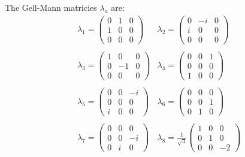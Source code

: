 The Gell-Mann matricies $\lambda_a$ are:
\begin{equation}
  \begin{aligned}
    &\lambda_1 = \left(\begin{matrix} 0 & 1 & 0 \\ 1 & 0 & 0 \\ 0 & 0 & 0 \end{matrix}\right) &\lambda_2 = \left(\begin{matrix} 0 & -i & 0 \\ i & 0 & 0 \\ 0 & 0 & 0 \end{matrix}\right) \\\\
    &\lambda_3 = \left(\begin{matrix} 1 & 0 & 0 \\ 0 & -1 & 0 \\ 0 & 0 & 0 \end{matrix}\right) &\lambda_4 = \left(\begin{matrix} 0 & 0 & 1 \\ 0 & 0 & 0 \\ 1 & 0 & 0 \end{matrix}\right) \\\\
    &\lambda_5 = \left(\begin{matrix} 0 & 0 & -i \\ 0 & 0 & 0 \\ i & 0 & 0 \end{matrix}\right) &\lambda_6 = \left(\begin{matrix} 0 & 0 & 0 \\ 0 & 0 & 1 \\ 0 & 1 & 0 \end{matrix}\right) \\\\
    &\lambda_7 = \left(\begin{matrix} 0 & 0 & 0 \\ 0 & 0 & -i \\ 0 & i & 0 \end{matrix}\right) &\lambda_8 = \frac{1}{\sqrt{3}} \left(\begin{matrix} 1 & 0 & 0 \\ 0 & 1 & 0 \\ 0 & 0 & -2 \end{matrix}\right)
  \end{aligned}
\end{equation}
